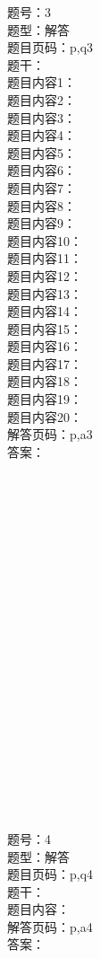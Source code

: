 \documentclass[11pt]{article}
\theoremstyle{definition}
\begin{document}
\begin{CJK*}{UTF8}{gbsn}
题号：3\\
题型：解答\\
题目页码：p,q3\\
题干：\\
题目内容1：\\
题目内容2：\\
题目内容3：\\
题目内容4：\\
题目内容5：\\
题目内容6：\\
题目内容7：\\
题目内容8：\\
题目内容9：\\
题目内容10：\\
题目内容11：\\
题目内容12：\\
题目内容13：\\
题目内容14：\\
题目内容15：\\
题目内容16：\\
题目内容17：\\
题目内容18：\\
题目内容19：\\
题目内容20：\\
解答页码：p,a3\\
答案：\\
\\
\\
\\
\\
\\
\\
\\
\\
\\
\\
\\
\\
\\
\\
\\
\\
\\
\\
\\
\\
\\

题号：4\\
题型：解答\\
题目页码：p,q4\\
题干：\\
题目内容：\\
解答页码：p,a4\\
答案：\\


\end{CJK*}
\end{document}
